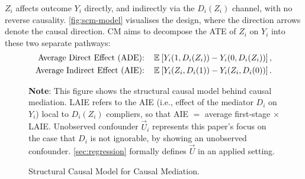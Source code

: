 $Z_i$ affects outcome $Y_i$ directly, and indirectly via the $D_i(Z_i)$ channel, with no reverse causality.
\autoref{fig:scm-model} visualises the design, where the direction arrows denote the causal direction.
CM aims to decompose the ATE of $Z_i$ on $Y_i$ into these two separate pathways:
\begin{align*}
    \text{Average Direct Effect (ADE): } \;\;\;&
        \mathbb{E}_{} \left[ Y_i(1, D_i(Z_i)) - Y_i(0, D_i(Z_i)) \right], \\
    \text{Average Indirect Effect (AIE): } \;\;\;&
            \mathbb{E}_{} \left[ Y_i(Z_i, D_i(1)) - Y_i(Z_i, D_i(0)) \right].
\end{align*}

\begin{figure}[h!]
    \centering
    \singlespacing
    \caption{Structural Causal Model for Causal Mediation.}
    \label{fig:scm-model}
    \justify
    \footnotesize
    \textbf{Note}:
    This figure shows the structural causal model behind causal mediation.
    LAIE refers to the AIE (i.e., effect of the mediator $D_i$ on $Y_i$) local to $D_i(Z_i)$ compliers, so that AIE $=$ average first-stage $\times$ LAIE.
    Unobserved confounder $\vec U_i$ represents this paper's focus on the case that $D_i$ is not ignorable, by showing an unobserved confounder.
    \autoref{sec:regression} formally defines $\vec U$ in an applied setting.
\end{figure}

